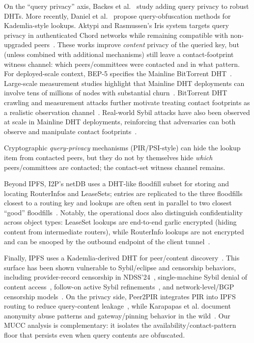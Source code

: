 \documentclass[11pt]{article}
\begin{document}
On the ``query privacy'' axis, Backes et al.~\cite{backes2012queryprivacy} study adding query privacy to robust DHTs.
More recently, Daniel et al.~\cite{daniel2025kademliaObfuscation} propose query-obfuscation methods for Kademlia-style lookups.
Aktypi and Rasmussen's Iris system targets query privacy in authenticated Chord networks while remaining compatible with non-upgraded peers~\cite{aktypi2025iris}.
These works improve \emph{content} privacy of the queried key, but (unless combined with additional mechanisms) still leave a contact-footprint witness channel: which peers/committees were contacted and in what pattern.
For deployed-scale context, BEP-5 specifies the Mainline BitTorrent DHT~\cite{bep5}.
Large-scale measurement studies highlight that Mainline DHT deployments can involve tens of millions of nodes with substantial churn~\cite{wang2013mldht,mldhtProjectPage}.
BitTorrent DHT crawling and measurement attacks further motivate treating contact footprints as a realistic observation channel~\cite{wolchok2010crawling,falkner2007profiling}.
Real-world Sybil attacks have also been observed at scale in Mainline DHT deployments, reinforcing that adversaries can both observe and manipulate contact footprints~\cite{wang2012sybil}.

Cryptographic \emph{query-privacy} mechanisms (PIR/PSI-style) can hide the lookup item from contacted peers, but they do not by themselves hide \emph{which} peers/committees are contacted; the contact-set witness channel remains.

Beyond IPFS, I2P's netDB uses a DHT-like floodfill subset for storing and locating RouterInfos and LeaseSets; entries are replicated to the three floodfills closest to a routing key and lookups are often sent in parallel to two closest ``good'' floodfills~\cite{i2p_netdb_overview}.
Notably, the operational docs also distinguish confidentiality across object types: LeaseSet lookups are end-to-end garlic encrypted (hiding content from intermediate routers), while RouterInfo lookups are not encrypted and can be snooped by the outbound endpoint of the client tunnel~\cite{i2p_netdb_overview}.

Finally, IPFS uses a Kademlia-derived DHT for peer/content discovery~\cite{ipfs_kad_dht_spec}.
This surface has been shown vulnerable to Sybil/eclipse and censorship behaviors, including provider-record censorship in NDSS'24~\cite{sridhar2024ipfs_censorship}, single-machine Sybil denial of content access~\cite{cholez2024ipfs_sybil}, follow-on active Sybil refinements~\cite{netto2025ipfs_active_sybil}, and network-level/BGP censorship models~\cite{mattertran2025ipfs_censorship}.
On the privacy side, Peer2PIR integrates PIR into IPFS routing to reduce query-content leakage~\cite{mazmudar2024peer2pir}, while Karapapas et al. document anonymity abuse patterns and gateway/pinning behavior in the wild~\cite{karapapas2025ipfs_anonymity_abuse}.
Our MUCC analysis is complementary: it isolates the availability/contact-pattern floor that persists even when query contents are obfuscated.
\end{document}

